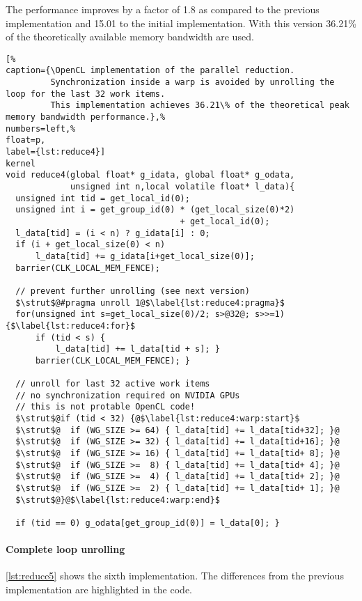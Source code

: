 The performance improves by a factor of 1.8 as compared to the previous implementation and 15.01 to the initial implementation.
With this version 36.21\% of the theoretically available memory bandwidth are used.

\begin{lstlisting}[%                                                             
caption={\OpenCL implementation of the parallel reduction.
         Synchronization inside a warp is avoided by unrolling the loop for the last 32 work items.
         This implementation achieves 36.21\% of the theoretical peak memory bandwidth performance.},%
numbers=left,%
float=p,
label={lst:reduce4}]
kernel
void reduce4(global float* g_idata, global float* g_odata,
             unsigned int n,local volatile float* l_data){
  unsigned int tid = get_local_id(0);
  unsigned int i = get_group_id(0) * (get_local_size(0)*2)
                                   + get_local_id(0);
  l_data[tid] = (i < n) ? g_idata[i] : 0;
  if (i + get_local_size(0) < n) 
      l_data[tid] += g_idata[i+get_local_size(0)];  
  barrier(CLK_LOCAL_MEM_FENCE);

  // prevent further unrolling (see next version)
  $\strut$@#pragma unroll 1@$\label{lst:reduce4:pragma}$
  for(unsigned int s=get_local_size(0)/2; s>@32@; s>>=1) {$\label{lst:reduce4:for}$
      if (tid < s) {
          l_data[tid] += l_data[tid + s]; }
      barrier(CLK_LOCAL_MEM_FENCE); }

  // unroll for last 32 active work items
  // no synchronization required on NVIDIA GPUs
  // this is not protable OpenCL code!
  $\strut$@if (tid < 32) {@$\label{lst:reduce4:warp:start}$
  $\strut$@  if (WG_SIZE >= 64) { l_data[tid] += l_data[tid+32]; }@
  $\strut$@  if (WG_SIZE >= 32) { l_data[tid] += l_data[tid+16]; }@
  $\strut$@  if (WG_SIZE >= 16) { l_data[tid] += l_data[tid+ 8]; }@
  $\strut$@  if (WG_SIZE >=  8) { l_data[tid] += l_data[tid+ 4]; }@
  $\strut$@  if (WG_SIZE >=  4) { l_data[tid] += l_data[tid+ 2]; }@
  $\strut$@  if (WG_SIZE >=  2) { l_data[tid] += l_data[tid+ 1]; }@
  $\strut$@}@$\label{lst:reduce4:warp:end}$

  if (tid == 0) g_odata[get_group_id(0)] = l_data[0]; }
\end{lstlisting}

\paragraph{Complete loop unrolling}

\autoref{lst:reduce5} shows the sixth implementation.
The differences from the previous implementation are highlighted in the code.

